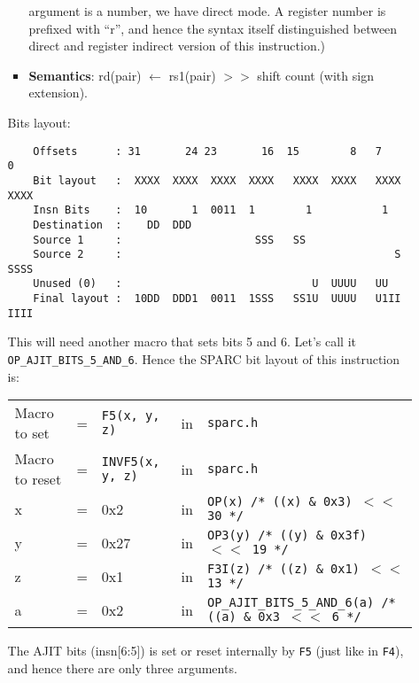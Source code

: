 \begin{enumerate}
\begin{enumerate}
\begin{itemize}
      argument is a number, we have direct mode.  A register number is
      prefixed with  ``r'', and hence the  syntax itself distinguished
      between   direct  and   register   indirect   version  of   this
      instruction.)
    \item []\textbf{Semantics}: rd(pair) $\leftarrow$ rs1(pair) $>>$
      shift count (with sign extension).
    \end{itemize}
    Bits layout:
\begin{verbatim}
    Offsets      : 31       24 23       16  15        8   7        0
    Bit layout   :  XXXX  XXXX  XXXX  XXXX   XXXX  XXXX   XXXX  XXXX
    Insn Bits    :  10       1  0011  1        1           1        
    Destination  :    DD  DDD                                       
    Source 1     :                     SSS   SS
    Source 2     :                                           S  SSSS
    Unused (0)   :                              U  UUUU   UU        
    Final layout :  10DD  DDD1  0011  1SSS   SS1U  UUUU   U1II  IIII
\end{verbatim}

    This will need another macro that sets bits 5 and 6. Let's call it
    \texttt{OP\_AJIT\_BITS\_5\_AND\_6}.   Hence the  SPARC bit  layout of  this
    instruction is:

    \begin{tabular}[h]{lclcl}
      Macro to set  &=& \texttt{F5(x, y, z)} &in& \texttt{sparc.h}     \\
      Macro to reset  &=& \texttt{INVF5(x, y, z)} &in& \texttt{sparc.h}     \\
      x &=& 0x2      &in& \texttt{OP(x)  /* ((x) \& 0x3)  $<<$ 30 */} \\
      y &=& 0x27     &in& \texttt{OP3(y) /* ((y) \& 0x3f) $<<$ 19 */} \\
      z &=& 0x1      &in& \texttt{F3I(z) /* ((z) \& 0x1)  $<<$ 13 */} \\
      a &=& 0x2      &in& \texttt{OP\_AJIT\_BITS\_5\_AND\_6(a) /* ((a) \& 0x3  $<<$ 6 */}
    \end{tabular}

    The AJIT bits (insn[6:5]) is  set or reset internally by \texttt{F5}
    (just  like  in  \texttt{F4}),  and   hence  there  are  only  three
    arguments.


\end{enumerate}
\end{enumerate}
